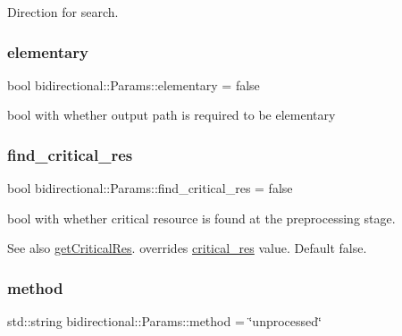 Direction for search. 

\mbox{\label{classbidirectional_1_1Params_aa19060565463ffc251019a1dea026e6d}} 
\subsubsection{\texorpdfstring{elementary}{elementary}}
{\footnotesize\ttfamily bool bidirectional\+::\+Params\+::elementary = false}



bool with whether output path is required to be elementary 

\mbox{\label{classbidirectional_1_1Params_aafe66809d74beb22c445a72ca7955f85}} 
\subsubsection{\texorpdfstring{find\+\_\+critical\+\_\+res}{find\_critical\_res}}
{\footnotesize\ttfamily bool bidirectional\+::\+Params\+::find\+\_\+critical\+\_\+res = false}

bool with whether critical resource is found at the preprocessing stage. \begin{DoxySeeAlso}{See also}
\hyperlink{namespacebidirectional_a7b92b2282139801a9e2668a743ad07a1}{get\+Critical\+Res}. overrides \hyperlink{classbidirectional_1_1Params_a7d318c4af901a82c3f566d59c6de1b62}{critical\+\_\+res} value. Default false. 
\end{DoxySeeAlso}
\mbox{\label{classbidirectional_1_1Params_a2faf36e89993c9fd0979e3e42b2332ea}} 
\subsubsection{\texorpdfstring{method}{method}}
{\footnotesize\ttfamily std\+::string bidirectional\+::\+Params\+::method = \char`\"{}unprocessed\char`\"{}}

